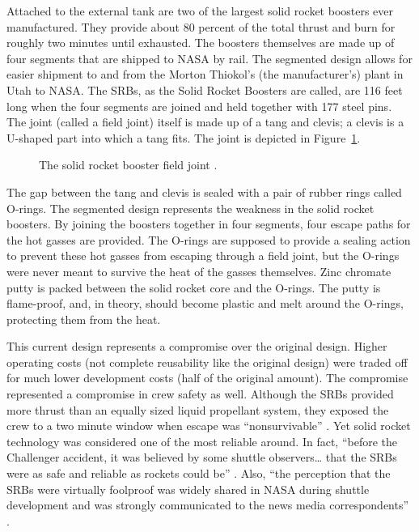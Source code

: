 Attached to the external tank are two of the largest solid
rocket boosters ever manufactured.
They provide about 80 percent of the total thrust and burn
for roughly two minutes until exhausted.
The boosters themselves are made up of four segments that
are shipped to NASA by rail.
The segmented design allows for easier shipment to and from
the Morton Thiokol's (the manufacturer's) plant in Utah to NASA.
The SRBs, as the Solid Rocket Boosters are called, are 116
feet long when the four segments are joined and held
together with 177 steel pins.
The joint (called a field joint) itself is made up of a tang
and clevis;  a clevis is a U-shaped part into which a tang
fits.
The joint is depicted in Figure~\ref{fieldj}.
\begin{figure}[p]
\vspace{4.75in}
\caption{The solid rocket booster field joint
\protect\cite[vol. 1, p. 57]{rogers}.}
\label{fieldj}
\end{figure}

The gap between the tang and clevis is sealed with a pair of
rubber rings called O-rings.
The segmented design represents the weakness in the 
solid rocket boosters.
By joining the boosters together in four segments, four
escape paths for the hot gasses are provided.
The O-rings are supposed to provide a sealing action to
prevent these hot gasses from escaping through a field
joint, but the O-rings were never meant to survive the heat
of the gasses themselves.
Zinc chromate putty is packed between the solid rocket core
and the O-rings.
The putty is flame-proof, and, in theory, should become
plastic and melt around the O-rings, protecting them from
the heat.


This current design represents a compromise over
the original design.  Higher operating costs (not complete
reusability like the original design) were traded off for
much lower development costs (half of the original amount).
The compromise represented a compromise in crew safety as
well.  Although the SRBs provided more thrust than an
equally sized liquid propellant system, they exposed the
crew to a two minute window when escape was
``nonsurvivable'' \cite[p. 59]{lewis}.
Yet solid rocket technology was considered one of the
most reliable around.  In fact, ``before the Challenger
accident, it was believed by some shuttle observers\ldots
that the SRBs were as safe and reliable as rockets could
be'' \cite[pp. 63--64]{lewis}.  Also, ``the perception that
the SRBs were virtually foolproof was widely shared in NASA
during shuttle development and was strongly communicated to
the news media correspondents'' \cite[p. 64]{lewis}.

